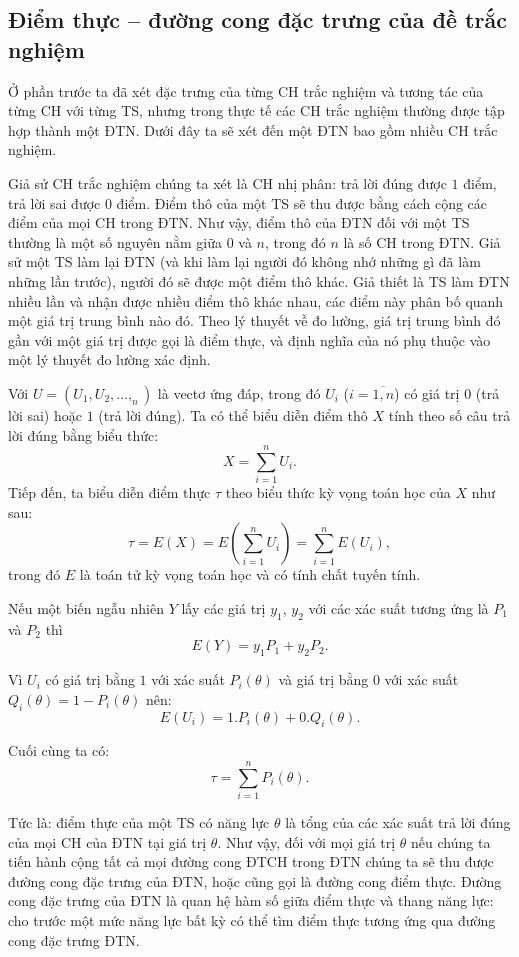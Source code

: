 \subsection{Điểm thực – đường cong đặc trưng của đề trắc nghiệm}
Ở phần trước ta đã xét đặc trưng của từng CH trắc nghiệm và tương tác của từng CH với từng TS, nhưng trong thực tế các CH trắc nghiệm thường được tập hợp thành một ĐTN. Dưới đây ta sẽ xét đến một ĐTN bao gồm nhiều CH trắc nghiệm.\par
Giả sử CH trắc nghiệm chúng ta xét là CH nhị phân: trả lời đúng được $1$ điểm, trả lời sai được $0$ điểm. Điểm thô của một TS sẽ thu được bằng cách cộng các điểm của mọi CH trong ĐTN. Như vậy, điểm thô của ĐTN đối với một TS thường là một số nguyên nằm giữa $0$ và $n$, trong đó $n$ là số CH trong ĐTN. Giả sử một TS làm lại ĐTN (và khi làm lại người đó không nhớ những gì đã làm những lần trước), người đó sẽ được một điểm thô khác. Giả thiết là TS làm ĐTN nhiều lần và nhận được nhiều điểm thô khác nhau, các điểm này phân bố quanh một giá trị trung bình nào đó. Theo lý thuyết về đo lường, giá trị trung bình đó gần với một giá trị được gọi là điểm thực, và định nghĩa của nó phụ thuộc vào một lý thuyết đo lường xác định.\par
Với $U=\left(U_1,U_2,...,_n\right)$ là vectơ ứng đáp, trong đó $U_i$ ($i=\overline{1,n}$) có giá trị $0$ (trả lời sai) hoặc $1$ (trả lời đúng). Ta có thể biểu diễn điểm thô $X$ tính theo số câu trả lời đúng bằng biểu thức: $$X=\sum_{i=1}^{n}U_i.$$
Tiếp đến, ta biểu diễn điểm thực $\tau$ theo biểu thức kỳ vọng toán học của $X$ như sau: $$\tau=E(X)=E\left(\sum_{i=1}^{n}U_i\right)=\sum_{i=1}^{n}E\left(U_i\right),$$ trong đó $E$ là toán tử kỳ vọng toán học và có tính chất tuyến tính.\par
Nếu một biến ngẫu nhiên $Y$ lấy các giá trị $y_1$, $y_2$ với các xác suất tương ứng là $P_1$ và $P_2$ thì $$E(Y)=y_1P_1+y_2P_2.$$\par
Vì $U_i$ có giá trị bằng $1$ với xác suất $P_i(\theta)$ và giá trị bằng $0$ với xác suất $Q_i(\theta)=1-P_i(\theta)$ nên:
$$E\left(U_i\right)=1.P_i(\theta)+0.Q_i(\theta).$$\par
Cuối cùng ta có: $$\tau=\sum_{i=1}^{n}P_i(\theta).$$\par
Tức là: điểm thực của một TS có năng lực $\theta$ là tổng của các xác suất trả lời đúng của mọi CH của ĐTN tại giá trị $\theta$. Như vậy, đối với mọi giá trị $\theta$ nếu chúng ta tiến hành cộng tất cả mọi đường cong ĐTCH trong ĐTN chúng ta sẽ thu được đường cong đặc trưng của ĐTN, hoặc cũng gọi là đường cong điểm thực. Đường cong đặc trưng của ĐTN là quan hệ hàm số giữa điểm thực và thang năng lực: cho trước một mức năng lực bất kỳ có thể tìm điểm thực tương ứng qua đường cong đặc trưng ĐTN.\par
